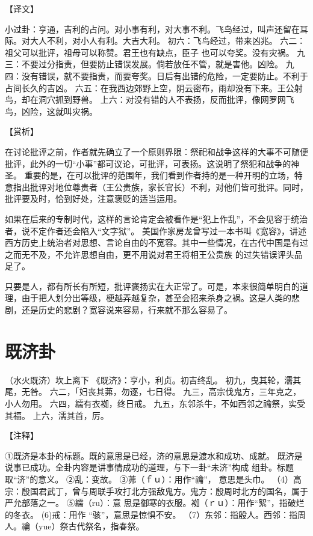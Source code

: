 \documentclass[a4paper,12pt,UTF8,twoside]{ctexbook}
\begin{document}
【译文】

小过卦：亨通，吉利的占问。对小事有利，对大事不利。飞鸟经过，叫声还留在耳际。对大人不利，对小人有利。大吉大利。
初六：飞鸟经过，带来凶兆。
六二：祖父可以批评，祖母可以称赞。君王也有缺点，臣子 也可以夸奖。没有灾祸。
九三：不要过分指责，但要防止错误发展。倘若放任不管，就是害他。凶险。
九四：没有错误，就不要指责，而要夸奖。日后有出错的危险，一定要防止。不利于占间长久的吉凶。
六五：在我西边郊野上空，阴云密布，雨却没有下来。王公射鸟，却在洞穴抓到野兽。
上六：对没有错的人不表扬，反而批评，像网罗网飞鸟，凶险，这就叫灾祸。

【赏析】

在讨论批评之前，作者就先确立了一个原则界限：祭祀和战争这样的大事不可随便批评，此外的一切“小事”都可议论，可批评，可表扬。这说明了祭犯和战争的神圣。 重要的是，在可以批评的范围年，我们看到作者持的是一种开明的立场，特意指出批评对地位尊贵者（王公贵族，家长官长）不利，对他们皆可批评。同时，批评要及时，恰到好处，注意褒贬的适当运用。

如果在后来的专制时代，这样的言论肯定会被看作是“犯上作乱”，不会见容于统治者，说不定作者还会陷入“文字狱”。 美国作家房龙曾写过一本书叫《宽容》，讲述西方历史上统治者对思想、言论自由的不宽容。其中一些情况，在古代中国是有过之而无不及，不允许思想自由，更不用说对君王将相王公贵族 的过失错误评头品足了。

只要是人，都有所长有所短，批评褒扬实在大正常了。可是，本来很简单明白的道理，由于把人划分出等级，梗越弄越复杂，甚至会招来杀身之祸。这是人类的悲剧，还是历史的悲剧？宽容说来容易，行来就不那么容易了。

\chapter{既济卦}

（水火既济）坎上离下
《既济》：亨小，利贞。初吉终乱。
初九，曳其轮，濡其尾，无咎。
六二，「妇丧其茀，勿逐，七日得。
九三，高宗伐鬼方，三年克之，小人勿用。
六四，繻有衣袽，终日戒。
九五，东邻杀牛，不如西邻之禴祭，实受其福。
上六，濡其首，厉。

【注释】

①既济是本卦的标题。既的意思是已经，济的意思是渡水和成功、成就。 既济是说事已成功。全卦内容是讲事情成功的道理，与下一卦“未济”构成 组卦。标题取“济”的意义。
②乱：变故。
③茀（ｆｕ）：用作“禴”， 意思是头巾。
（4）高宗：殷国君武丁，曾与周联手攻打北方强敌鬼方。鬼方：殷周时北方的国名，属于严允部落之一。
⑤繻（ru）：意 思是御寒的衣服。袽（ｒｕ）：用作“絮”，指破烂的冬衣。
(6)戒：用作 “骇”，意思是惊惧不安。
（7）东邻：指殷人。西邻：指周人。禴（yue）祭古代祭名，指春祭。
\end{document}

